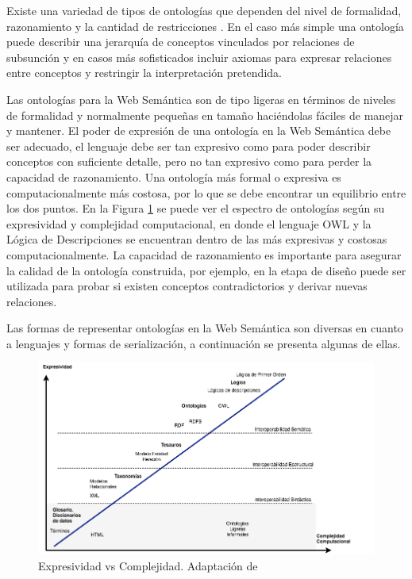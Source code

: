 Existe una variedad de tipos de ontologías que dependen del nivel de formalidad, razonamiento y la cantidad de restricciones\cite{Giunchiglia2009LightweightO} \cite{Obrst}. En el caso más simple una ontología puede describir una jerarquía de conceptos vinculados por relaciones de subsunción y en casos más sofisticados incluir axiomas para expresar relaciones entre conceptos y restringir la interpretación pretendida.

Las ontologías para la Web Semántica son de tipo ligeras en términos de niveles de formalidad y normalmente pequeñas en tamaño haciéndolas fáciles de manejar y mantener\cite{Thorsen2015OntologiesIT}. El poder de expresión de una ontología en la Web Semántica debe ser adecuado, el lenguaje debe ser tan expresivo como para poder describir conceptos con suficiente detalle, pero no tan expresivo como para perder la capacidad de razonamiento\cite{reasonableSemantic}. Una ontología más formal o expresiva es computacionalmente más costosa, por lo que se debe encontrar un equilibrio entre los dos puntos. En la Figura \ref{img:expresividad complejidad } se puede ver el espectro de ontologías según su expresividad y complejidad computacional, en donde el lenguaje OWL y la Lógica de Descripciones se encuentran dentro de las más expresivas y costosas computacionalmente.
La capacidad de razonamiento es importante para asegurar la calidad de la ontología construida, por ejemplo, en la etapa de diseño puede ser utilizada para probar si existen conceptos contradictorios y derivar nuevas relaciones.

Las formas de representar ontologías en la Web Semántica son diversas en cuanto a lenguajes y formas de serialización, a continuación se presenta algunas de ellas.

    \begin{figure}[ht!]
    \centering
    \includegraphics[width=150mm]{figuras/Diagramas-ComplejidadOntologica}
    \caption{Expresividad vs Complejidad. Adaptación de \cite{Giunchiglia2009LightweightO} \cite{Obrst}}
    \label{img:expresividad complejidad }
    \end{figure}



